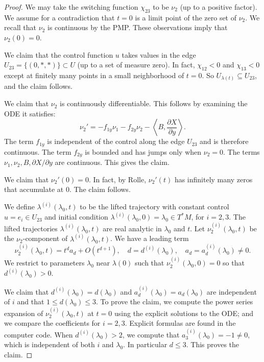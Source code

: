 \documentclass{article}
\theoremstyle{remark}
\newcommand{\ang}[1]{\left\langle{#1}\right\rangle}
\newcommand{\partials}[2]{\frac{\partial #1}{\partial #2}}
\begin{document}
\begin{proof} 
  We may take the switching function $\chi_{23}$ to be $\nu_2$ (up to
  a positive factor).  We assume for a contradiction that
  $t=0$ is a limit point of the zero
  set of $\nu_2$.  We recall that $\nu_2$ is continuous by the
  PMP.  These observations imply that $\nu_2(0)=0$.

We claim that the control function $u$ takes values in the edge
$U_{23}=\{(0,*,*)\}\subset U$ (up to a set of measure zero).  In fact,
$\chi_{12}<0$ and $\chi_{13}<0$ except at finitely many points in a
small neighborhood of $t=0$.  So $U_{\lambda(t)}\subseteq U_{23}$,
and the claim follows.

We claim that $\nu_2$ is continuously differentiable.  This follows by
examining the ODE it satisfies:
\[
\nu_2' = -f_{1y}\nu_1 - f_{2y} \nu_2 - \ang{B,\partials{X}{y}}.
\]
The term $f_{1y}$ is independent of the control along the edge
$U_{23}$ and is therefore continuous.  The term $f_{2y}$ is bounded
and has jumps only when $\nu_2=0$.  The terms $\nu_1,\nu_2,B,\partial
X/\partial y$ are continuous.  This gives the claim.

We claim that $\nu_2'(0)=0$.  In fact, by Rolle, $\nu_2'(t)$ has
infinitely many zeros that accumulate at $0$.  The claim follows.

We define $\lambda^{(i)}(\lambda_0,t)$ to be the lifted trajectory
with constant control $u=e_i\in U_{23}$ and initial condition
$\lambda^{(i)}(\lambda_0,0)=\lambda_0\in T^*M$, for $i=2,3$.  The
lifted trajectories $\lambda^{(i)}(\lambda_0,t)$ are real analytic in
$\lambda_0$ and $t$.  Let $\nu^{(i)}_2(\lambda_0,t)$ be the
$\nu_2$-component of $\lambda^{(i)}(\lambda_0,t)$.  We have a leading
term
\[
\nu^{(i)}_2(\lambda_0,t) = t^d a_d + O(t^{d+1}),\quad
d = d^{(i)}(\lambda_0),\quad a_d = a_d^{(i)}(\lambda_0)\ne0.
\]
We restrict to parameters $\lambda_0$ near $\lambda(0)$ such that
$\nu_2^{(i)}(\lambda_0,0)=0$ so that $d^{(i)}(\lambda_0)>0$.

We claim that $d^{(i)}(\lambda_0) = d(\lambda_0)$ and
$a_d^{(i)}(\lambda_0)=a_d(\lambda_0)$ are independent of $i$ and that
$1 \le d(\lambda_0) \le 3$.  To prove the claim, we compute the power
series expansion of $\nu_2^{(i)}(\lambda_0,t)$ at $t=0$ using the
explicit solutions to the ODE; and we compare the coefficients for
$i=2,3$.  Explicit formulas are found in the computer code.  When
$d^{(i)}(\lambda_0)> 2$, we compute that
$a_3^{(i)}(\lambda_0)=-1\ne0$, which is independent of both $i$ and
$\lambda_0$.  In particular $d\le 3$.  This proves the claim.


\end{proof}
\end{document}
